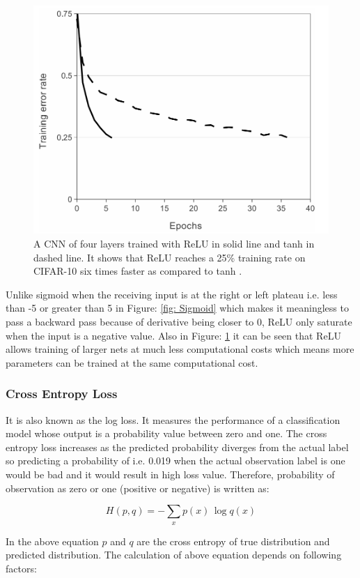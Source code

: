\documentclass[11pt]{article}
\begin{document}
\begin{figure}[ht!]
	\centering
	\includegraphics[width=.6\linewidth]{files/cnn_architecture/relu_fast.png}
	\caption{A CNN of four layers trained with ReLU in solid line and tanh in dashed line. It shows that ReLU reaches a 25\% training rate on CIFAR-10 six times faster as compared to tanh \cite{krizhevsky2012imagenet}. }
	\label{fig: relu_fast}
\end{figure}

Unlike sigmoid when the receiving input is at the right or left plateau i.e. less than -5 or greater than 5 in Figure: \ref{fig: Sigmoid} which makes it meaningless to pass a backward pass because of derivative being closer to 0, ReLU only saturate when the input is a negative value. Also in Figure: \ref{fig: relu_fast} it can be seen that ReLU allows training of larger nets at much less computational costs which means more parameters can be trained at the same computational cost.

\subsubsection{Cross Entropy Loss}
It is also known as the log loss. It measures the performance of a classification model whose output is a probability value between zero and one. The cross entropy loss increases as the predicted probability diverges from the actual label so predicting a probability of i.e. 0.019 when the actual observation label is one would be bad and it would result in high loss value. Therefore, probability of observation as zero or one (positive or negative) is written as:

\begin{equation}
\label{crossent}
{\displaystyle H(p,q)=-\sum _{x}p(x)\,\log q(x)}
\end{equation}

In the above equation $p$ and $q$ are the cross entropy of true distribution and predicted distribution. The calculation of above equation depends on following factors:
\end{document}
